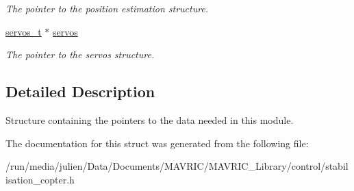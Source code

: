 \begin{DoxyCompactItemize}
\begin{DoxyCompactList}\small\item\em The pointer to the position estimation structure. \end{DoxyCompactList}\item 
\hypertarget{structstabilise__copter__t_a1e7fe92987ab647fdf751ad9052a13e7}{\hyperlink{structservos__t}{servos\+\_\+t} $\ast$ \hyperlink{structstabilise__copter__t_a1e7fe92987ab647fdf751ad9052a13e7}{servos}}\label{structstabilise__copter__t_a1e7fe92987ab647fdf751ad9052a13e7}

\begin{DoxyCompactList}\small\item\em The pointer to the servos structure. \end{DoxyCompactList}\end{DoxyCompactItemize}


\subsection{Detailed Description}
Structure containing the pointers to the data needed in this module. 

The documentation for this struct was generated from the following file\+:\begin{DoxyCompactItemize}
\item 
/run/media/julien/\+Data/\+Documents/\+M\+A\+V\+R\+I\+C/\+M\+A\+V\+R\+I\+C\+\_\+\+Library/control/stabilisation\+\_\+copter.\+h\end{DoxyCompactItemize}
